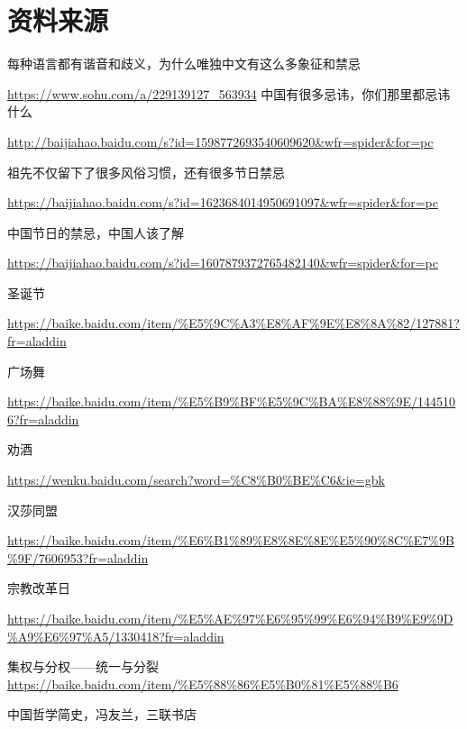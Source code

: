 \chapter{资料来源}
\setlength\parindent{0em}
\cnprolight
\mypar
每种语言都有谐音和歧义，为什么唯独中文有这么多象征和禁忌 

\url{https://www.sohu.com/a/229139127_563934} 
\mypar
中国有很多忌讳，你们那里都忌讳什么 

\url{http://baijiahao.baidu.com/s?id=1598772693540609620&wfr=spider&for=pc }

祖先不仅留下了很多风俗习惯，还有很多节日禁忌 

\url{https://baijiahao.baidu.com/s?id=1623684014950691097&wfr=spider&for=pc} 

中国节日的禁忌，中国人该了解 

\url{https://baijiahao.baidu.com/s?id=1607879372765482140&wfr=spider&for=pc}

圣诞节

\url{https://baike.baidu.com/item/%E5%9C%A3%E8%AF%9E%E8%8A%82/127881?fr=aladdin}

广场舞

\url{https://baike.baidu.com/item/%E5%B9%BF%E5%9C%BA%E8%88%9E/1445106?fr=aladdin}

劝酒

\url{https://wenku.baidu.com/search?word=%C8%B0%BE%C6&ie=gbk}

汉莎同盟

\url{https://baike.baidu.com/item/%E6%B1%89%E8%8E%8E%E5%90%8C%E7%9B%9F/7606953?fr=aladdin}

宗教改革日

\url{https://baike.baidu.com/item/%E5%AE%97%E6%95%99%E6%94%B9%E9%9D%A9%E6%97%A5/1330418?fr=aladdin}

集权与分权——统一与分裂
\url{https://baike.baidu.com/item/%E5%88%86%E5%B0%81%E5%88%B6}

中国哲学简史，冯友兰，三联书店
